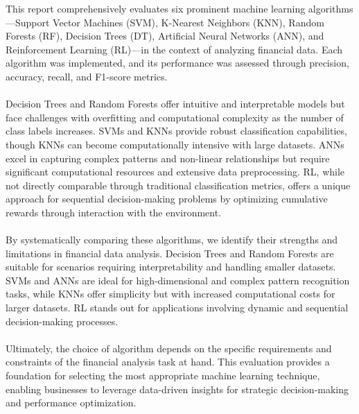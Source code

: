 \documentclass[12pt,a4paper]{report}
\begin{document}
This report comprehensively evaluates six prominent machine learning algorithms—Support Vector Machines (SVM), K-Nearest Neighbors (KNN), Random Forests (RF), Decision Trees (DT), Artificial Neural Networks (ANN), and Reinforcement Learning (RL)—in the context of analyzing financial data. Each algorithm was implemented, and its performance was assessed through precision, accuracy, recall, and F1-score metrics.
\\ \\
Decision Trees and Random Forests offer intuitive and interpretable models but face challenges with overfitting and computational complexity as the number of class labels increases. SVMs and KNNs provide robust classification capabilities, though KNNs can become computationally intensive with large datasets. ANNs excel in capturing complex patterns and non-linear relationships but require significant computational resources and extensive data preprocessing. RL, while not directly comparable through traditional classification metrics, offers a unique approach for sequential decision-making problems by optimizing cumulative rewards through interaction with the environment.
\\ \\
By systematically comparing these algorithms, we identify their strengths and limitations in financial data analysis. Decision Trees and Random Forests are suitable for scenarios requiring interpretability and handling smaller datasets. SVMs and ANNs are ideal for high-dimensional and complex pattern recognition tasks, while KNNs offer simplicity but with increased computational costs for larger datasets. RL stands out for applications involving dynamic and sequential decision-making processes.
\\ \\
Ultimately, the choice of algorithm depends on the specific requirements and constraints of the financial analysis task at hand. This evaluation provides a foundation for selecting the most appropriate machine learning technique, enabling businesses to leverage data-driven insights for strategic decision-making and performance optimization.






\renewcommand{\bibname}{References}

\addcontentsline{toc}{chapter}{\bibname}



\end{document}
